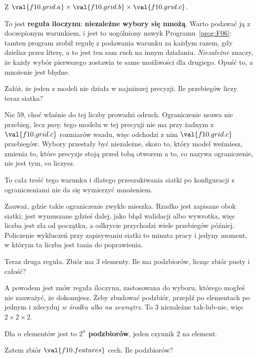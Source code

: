 \begin{fr}
Z $\val{f10.grid.a} \times \val{f10.grid.b} \times \val{f10.grid.c}$.

To jest \textbf{reguła iloczynu}: \textbf{niezależne wybory się mnożą}. Warto
podawać ją z doczepionym warunkiem, i jest to uogólniony nawyk
Programu~\ref{prog:F06}: tamten program zrobił regułę z podawania warunku za
każdym razem, gdy dzielisz przez literę, a to jest ten sam ruch na innym
działaniu. \emph{Niezależne} znaczy, że każdy wybór pierwszego zostawia te same
możliwości dla drugiego. Opuść to, a
mnożenie jest błędne.

Załóż, że jeden z modeli nie działa w najniższej precyzji. Ile przebiegów
liczy teraz siatka?
\nextframe
\end{fr}

\begin{fr}
Nie $59$, choć właśnie do tej liczby prowadzi odruch. Ograniczenie usuwa nie
przebieg, lecz \emph{parę}: tego modelu w tej precyzji nie ma przy żadnym z
$\val{f10.grid.c}$ rozmiarów wsadu, więc odchodzi z nim $\val{f10.grid.c}$
przebiegów. Wybory przestały być niezależne, skoro to, który model weźmiesz,
zmienia to, które precyzje stoją przed tobą otworem \dash{} a to, co nazywa
ograniczenie, nie jest tym, co liczysz.

To cała treść tego warunku i dlatego przeszukiwania siatki po konfiguracji z
ograniczeniami nie da się wymierzyć mnożeniem.

Zauważ, gdzie takie ograniczenie zwykle mieszka. Rzadko jest zapisane obok
siatki; jest wymuszane gdzieś dalej, jako błąd walidacji albo wywrotka, więc
liczba jest zła od początku, a odkrycie przychodzi wiele przebiegów później.
Policzenie wykluczeń przy zapisywaniu siatki to minuta pracy i jedyny moment,
w którym ta liczba jest tania do poprawienia.

Teraz druga reguła. Zbiór ma $3$ elementy. Ile ma podzbiorów, licząc zbiór
pusty i całość?
\dotline
\nextframe
\end{fr}

\begin{fr}
A powodem jest znów reguła iloczynu, zastosowana do wyboru, którego mogłeś nie
zauważyć, że dokonujesz. Żeby zbudować podzbiór, przejdź po elementach po
jednym i zdecyduj \emph{w środku albo na zewnątrz}. To $3$ niezależne
tak-lub-nie, więc $2 \times 2 \times 2$.

Dla $n$ elementów jest to \textbf{$2^{n}$ podzbiorów}, jeden czynnik $2$ na
element.

Zatem zbiór $\val{f10.features}$ cech. Ile podzbiorów?
\nextframe
\end{fr}

